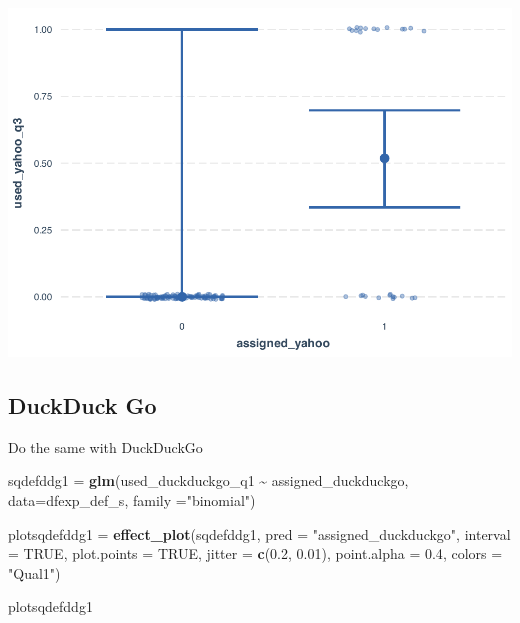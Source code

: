 \documentclass[
  11pt,
]{article}
\newenvironment{Shaded}{\begin{snugshade}}{\end{snugshade}}
\newcommand{\AttributeTok}[1]{\textcolor[rgb]{0.13,0.29,0.53}{#1}}
\newcommand{\ConstantTok}[1]{\textcolor[rgb]{0.56,0.35,0.01}{#1}}
\newcommand{\FloatTok}[1]{\textcolor[rgb]{0.00,0.00,0.81}{#1}}
\newcommand{\FunctionTok}[1]{\textcolor[rgb]{0.13,0.29,0.53}{\textbf{#1}}}
\newcommand{\NormalTok}[1]{#1}
\newcommand{\OtherTok}[1]{\textcolor[rgb]{0.56,0.35,0.01}{#1}}
\newcommand{\SpecialCharTok}[1]{\textcolor[rgb]{0.81,0.36,0.00}{\textbf{#1}}}
\newcommand{\StringTok}[1]{\textcolor[rgb]{0.31,0.60,0.02}{#1}}
\begin{document}
\includegraphics{analysis-July19_files/figure-latex/unnamed-chunk-21-3.pdf}

\hypertarget{duckduck-go}{%
\subsection{DuckDuck Go}\label{duckduck-go}}

Do the same with DuckDuckGo

\begin{Shaded}
\begin{Highlighting}[]
\NormalTok{sqdefddg1 }\OtherTok{=} \FunctionTok{glm}\NormalTok{(used\_duckduckgo\_q1 }\SpecialCharTok{\textasciitilde{}}\NormalTok{ assigned\_duckduckgo, }\AttributeTok{data=}\NormalTok{dfexp\_def\_s, }\AttributeTok{family =}\StringTok{"binomial"}\NormalTok{)}

\NormalTok{plotsqdefddg1 }\OtherTok{=} \FunctionTok{effect\_plot}\NormalTok{(sqdefddg1, }\AttributeTok{pred =} \StringTok{"assigned\_duckduckgo"}\NormalTok{, }\AttributeTok{interval =} \ConstantTok{TRUE}\NormalTok{, }\AttributeTok{plot.points =} \ConstantTok{TRUE}\NormalTok{, }\AttributeTok{jitter =} \FunctionTok{c}\NormalTok{(}\FloatTok{0.2}\NormalTok{, }\FloatTok{0.01}\NormalTok{), }\AttributeTok{point.alpha =} \FloatTok{0.4}\NormalTok{, }\AttributeTok{colors =} \StringTok{"Qual1"}\NormalTok{)}

\NormalTok{plotsqdefddg1}
\end{Highlighting}
\end{Shaded}
\end{document}
